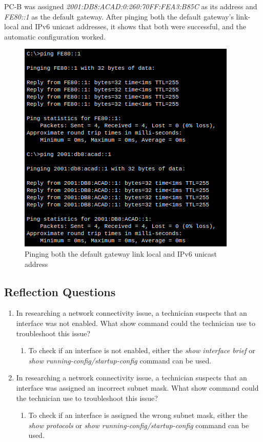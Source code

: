 \documentclass[a4paper]{article}
\newcommand{\abc}{\hfill \break}
\newcommand{\ii}{\textit}
\begin{document}
PC-B was assigned \ii{2001:DB8:ACAD:0:260:70FF:FEA3:B85C} as its address and \ii{FE80::1} as the default gateway.\abc
After pinging both the default gateway's link-local and IPv6 unicast addresses, it shows that both were successful, and the automatic configuration worked.
\begin{figure}[h]
	\includegraphics[scale=0.40]{images/pinging.png}
	\centering
	\caption{Pinging both the default gateway link local and IPv6 unicast address}
\end{figure}\abc
\subsection{Reflection Questions}
\begin{enumerate}
	\item In researching a network connectivity issue, a technician suspects that an interface was not enabled. What show command could the technician use to troubleshoot this issue?	
	\begin{enumerate}
		\item To check if an interface is not enabled, either the \ii{show interface brief} or \ii{show running-config/startup-config} command can be used. 
	\end{enumerate}
	\item In researching a network connectivity issue, a technician suspects that an interface was assigned an incorrect subnet mask. What show command could the technician use to troubleshoot this issue?
	\begin{enumerate}
		\item To check if an interface is assigned the wrong subnet mask, either the \ii{show protocols} or \ii{show running-config/startup-config} command can be used.
	\end{enumerate}
\end{enumerate}
\newpage
\end{document}
